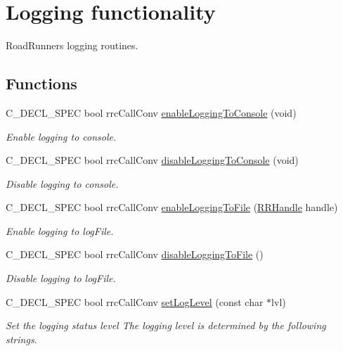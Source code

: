 \hypertarget{group__logging}{\section{Logging functionality}
\label{group__logging}
}


Road\-Runners logging routines.  


\subsection*{Functions}
\begin{DoxyCompactItemize}
\item 
C\-\_\-\-D\-E\-C\-L\-\_\-\-S\-P\-E\-C bool rrc\-Call\-Conv \hyperlink{group__logging_ga26aae545bbc31c1505ade0579741a4b9}{enable\-Logging\-To\-Console} (void)
\begin{DoxyCompactList}\small\item\em Enable logging to console. \end{DoxyCompactList}\item 
C\-\_\-\-D\-E\-C\-L\-\_\-\-S\-P\-E\-C bool rrc\-Call\-Conv \hyperlink{group__logging_gaa5be6edee1af88ca1f87bf17568ea1cb}{disable\-Logging\-To\-Console} (void)
\begin{DoxyCompactList}\small\item\em Disable logging to console. \end{DoxyCompactList}\item 
C\-\_\-\-D\-E\-C\-L\-\_\-\-S\-P\-E\-C bool rrc\-Call\-Conv \hyperlink{group__logging_ga4e852202d5b00e2f1482bf2c9e100799}{enable\-Logging\-To\-File} (\hyperlink{rrc__types_8h_a1d68f0592372208fa5a5f2799ea4b3ae}{R\-R\-Handle} handle)
\begin{DoxyCompactList}\small\item\em Enable logging to log\-File. \end{DoxyCompactList}\item 
C\-\_\-\-D\-E\-C\-L\-\_\-\-S\-P\-E\-C bool rrc\-Call\-Conv \hyperlink{group__logging_gaed2bf69408c13ca8e3d65149261e6689}{disable\-Logging\-To\-File} ()
\begin{DoxyCompactList}\small\item\em Disable logging to log\-File. \end{DoxyCompactList}\item 
C\-\_\-\-D\-E\-C\-L\-\_\-\-S\-P\-E\-C bool rrc\-Call\-Conv \hyperlink{group__logging_ga6e6cb15a163ea13e5ef9f0ebfded2c78}{set\-Log\-Level} (const char $\ast$lvl)
\begin{DoxyCompactList}\small\item\em Set the logging status level The logging level is determined by the following strings. \end{DoxyCompactList}\item 

\end{DoxyCompactItemize}
